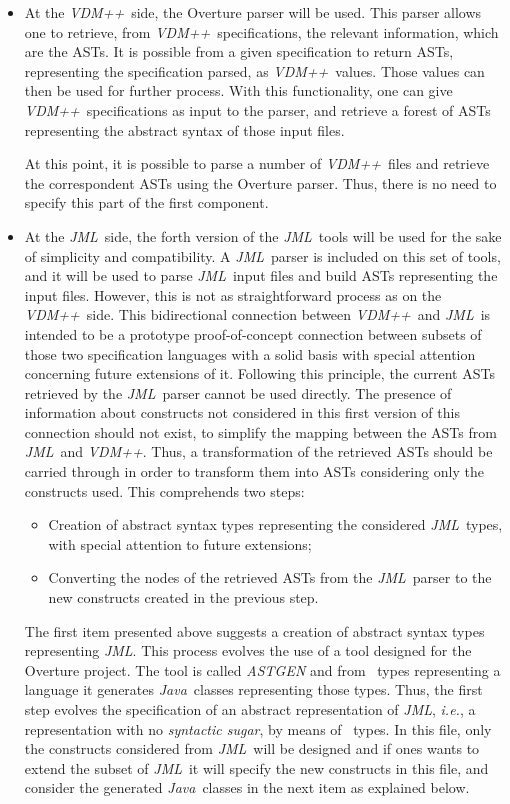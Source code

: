 \documentclass{llncs}
\newcommand{\jml}{\textit{JML}}
\newcommand{\vpp}{\textit{VDM++}}
\newcommand{\java}{\textit{Java}}
\newcommand{\ie}{\textit{i.e.}}
\begin{document}
\begin{itemize}
\item At the \vpp\ side, the Overture parser will be used. This parser allows one to retrieve, from \vpp\ specifications, the relevant information, which are the ASTs. It is possible from a given specification to return ASTs, representing the specification parsed, as \vpp\ values. Those values can then be used for further process.
With this functionality, one can give \vpp\ specifications as input to the parser, and retrieve a forest of ASTs representing the abstract syntax of those input files.

At this point, it is possible to parse a number of \vpp\ files and retrieve the correspondent ASTs using the Overture parser. Thus, there is no need to specify this part of the first component.

\item At the \jml\ side, the forth version of the \jml\ tools will be used for the sake of simplicity and compatibility. A \jml\ parser is included on this set of tools, and it will be used to parse \jml\ input files and build ASTs representing the input files. However, this is not as straightforward process as on the \vpp\ side. This bidirectional connection between \vpp\ and \jml\ is intended to be a prototype proof-of-concept connection between subsets of those two specification languages with a solid basis with special attention concerning future extensions of it. Following this principle, the current ASTs retrieved by the \jml\ parser cannot be used directly. The presence of information about constructs not considered in this first version of this connection should not exist, to simplify the mapping between the ASTs from \jml\ and \vpp. Thus, a transformation of the retrieved ASTs should be carried through in order to transform them into ASTs considering only the constructs used. This comprehends two steps:
\begin{itemize}
\item Creation of abstract syntax types representing the considered \jml\ types, with special attention to future extensions;
\item Converting the nodes of the retrieved ASTs from the \jml\ parser to the new constructs created in the previous step.
\end{itemize}

The first item presented above suggests a creation of abstract syntax types representing \jml. This process evolves the use of a tool designed for the Overture project. The tool is called \textit{ASTGEN} and from \vdm\ types representing a language it generates \java\ classes representing those types. Thus, the first step evolves the specification of an abstract representation of \jml, \ie, a representation with no \textit{syntactic sugar}, by means of \vdm\ types. In this file, only the constructs considered from \jml\ will be designed and if ones wants to extend the subset of \jml\ it will specify the new constructs in this file, and consider the generated \java\ classes in the next item as explained below.


\end{itemize}
\end{document}
